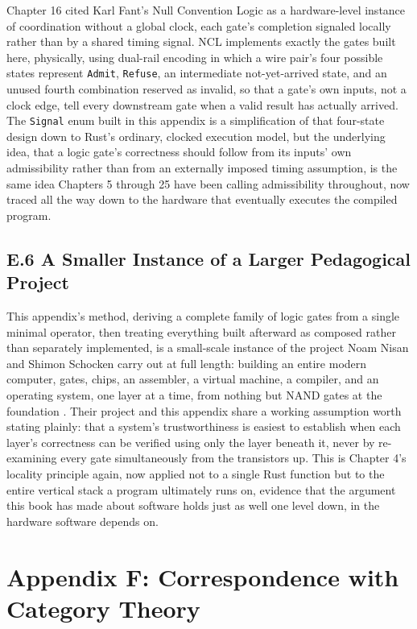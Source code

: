 \documentclass[11pt]{book}
\begin{document}
Chapter 16 cited Karl Fant's Null Convention Logic as a hardware-level instance of coordination without a global clock, each gate's completion signaled locally rather than by a shared timing signal. NCL implements exactly the gates built here, physically, using dual-rail encoding in which a wire pair's four possible states represent \texttt{Admit}, \texttt{Refuse}, an intermediate not-yet-arrived state, and an unused fourth combination reserved as invalid, so that a gate's own inputs, not a clock edge, tell every downstream gate when a valid result has actually arrived. The \texttt{Signal} enum built in this appendix is a simplification of that four-state design down to Rust's ordinary, clocked execution model, but the underlying idea, that a logic gate's correctness should follow from its inputs' own admissibility rather than from an externally imposed timing assumption, is the same idea Chapters 5 through 25 have been calling admissibility throughout, now traced all the way down to the hardware that eventually executes the compiled program.

\section*{E.6 A Smaller Instance of a Larger Pedagogical Project}

This appendix's method, deriving a complete family of logic gates from a single minimal operator, then treating everything built afterward as composed rather than separately implemented, is a small-scale instance of the project Noam Nisan and Shimon Schocken carry out at full length: building an entire modern computer, gates, chips, an assembler, a virtual machine, a compiler, and an operating system, one layer at a time, from nothing but NAND gates at the foundation \cite{nisan2005}. Their project and this appendix share a working assumption worth stating plainly: that a system's trustworthiness is easiest to establish when each layer's correctness can be verified using only the layer beneath it, never by re-examining every gate simultaneously from the transistors up. This is Chapter 4's locality principle again, now applied not to a single Rust function but to the entire vertical stack a program ultimately runs on, evidence that the argument this book has made about software holds just as well one level down, in the hardware software depends on.

\clearpage

\chapter[Correspondence with Category Theory]{Appendix F: Correspondence with Category Theory}
\end{document}
